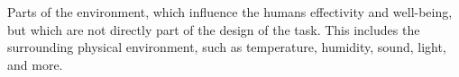 \begin{definition} \label{def:ambient_environment} 
  Parts of the environment, which influence the humans effectivity and well-being, but which are not directly part of the design of the task. This includes the surrounding physical environment, such as temperature, humidity, sound, light, and more. \cite[p. 27]{benyon14}
\end{definition}